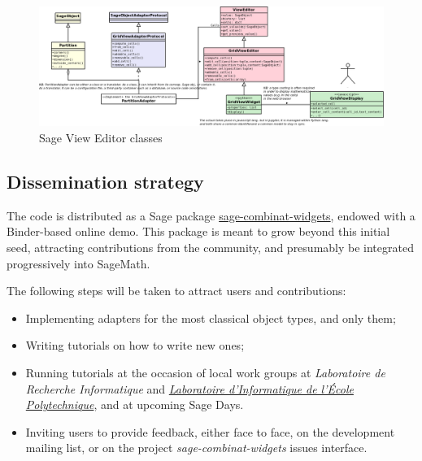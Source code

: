 \documentclass{deliverablereport}
\begin{document}
\begin{landscape}
\begin{figure}[h]
  \begin{center}
    \includegraphics[width=1.4\textheight]{schemas/SageViewEditor}
  \end{center}
  \caption{Sage View Editor classes}
  \label{fig:schema}
\end{figure}
\end{landscape}

\subsection{Dissemination strategy}

The code is distributed as a Sage package
\href{https://github.com/sagemath/sage-combinat-widgets/}{sage-combinat-widgets},
endowed with a Binder-based online demo.
This package is meant to grow beyond this initial seed, attracting
contributions from the community, and presumably be integrated
progressively into SageMath. 

The following steps will be taken to attract users and contributions:
\begin{itemize}
  \item Implementing adapters for the most classical object types, and
    only them;
  \item Writing tutorials on how to write new ones;
  \item Running tutorials at the occasion of local work groups at
    \emph{Laboratoire de Recherche Informatique} and
    \emph{\href{https://www.lix.polytechnique.fr/}{Laboratoire
        d'Informatique de l'École Polytechnique}}, and at upcoming
    Sage Days.
  \item Inviting users to provide feedback, either face to face, on
    the development mailing list, or on the project
    \emph{sage-combinat-widgets} issues interface.
\end{itemize}


\end{document}
